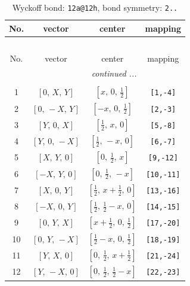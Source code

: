 \documentclass[fleqn,8pt]{jsarticle}
\begin{document}
\begin{longtable}{cccc}
\caption{Wyckoff bond: {\tt 12a@12h}, bond symmetry: {\tt 2..}}
 \\
 \hline \hline
No. & vector & center & mapping \\ \hline \endfirsthead

\multicolumn{3}{l}{\tablename\ \thetable{}} \\
 \hline \hline
No. & vector & center & mapping \\ \hline \endhead

 \hline \hline
\multicolumn{3}{r}{\footnotesize\it continued ...} \\ \endfoot

 \hline \hline
\multicolumn{3}{r}{} \\ \endlastfoot

1 & $\left[ 0,\, X,\, Y \right]$ & $\left[ x,\, 0,\, \frac{1}{2} \right]$ & {\tt [1,-4]} \\ \hline
2 & $\left[ 0,\, - X,\, Y \right]$ & $\left[ - x,\, 0,\, \frac{1}{2} \right]$ & {\tt [2,-3]} \\ \hline
3 & $\left[ Y,\, 0,\, X \right]$ & $\left[ \frac{1}{2},\, x,\, 0 \right]$ & {\tt [5,-8]} \\ \hline
4 & $\left[ Y,\, 0,\, - X \right]$ & $\left[ \frac{1}{2},\, - x,\, 0 \right]$ & {\tt [6,-7]} \\ \hline
5 & $\left[ X,\, Y,\, 0 \right]$ & $\left[ 0,\, \frac{1}{2},\, x \right]$ & {\tt [9,-12]} \\ \hline
6 & $\left[ - X,\, Y,\, 0 \right]$ & $\left[ 0,\, \frac{1}{2},\, - x \right]$ & {\tt [10,-11]} \\ \hline
7 & $\left[ X,\, 0,\, Y \right]$ & $\left[ \frac{1}{2},\, x + \frac{1}{2},\, 0 \right]$ & {\tt [13,-16]} \\ \hline
8 & $\left[ - X,\, 0,\, Y \right]$ & $\left[ \frac{1}{2},\, \frac{1}{2} - x,\, 0 \right]$ & {\tt [14,-15]} \\ \hline
9 & $\left[ 0,\, Y,\, X \right]$ & $\left[ x + \frac{1}{2},\, 0,\, \frac{1}{2} \right]$ & {\tt [17,-20]} \\ \hline
10 & $\left[ 0,\, Y,\, - X \right]$ & $\left[ \frac{1}{2} - x,\, 0,\, \frac{1}{2} \right]$ & {\tt [18,-19]} \\ \hline
11 & $\left[ Y,\, X,\, 0 \right]$ & $\left[ 0,\, \frac{1}{2},\, x + \frac{1}{2} \right]$ & {\tt [21,-24]} \\ \hline
12 & $\left[ Y,\, - X,\, 0 \right]$ & $\left[ 0,\, \frac{1}{2},\, \frac{1}{2} - x \right]$ & {\tt [22,-23]} \\
\end{longtable}
\end{document}
